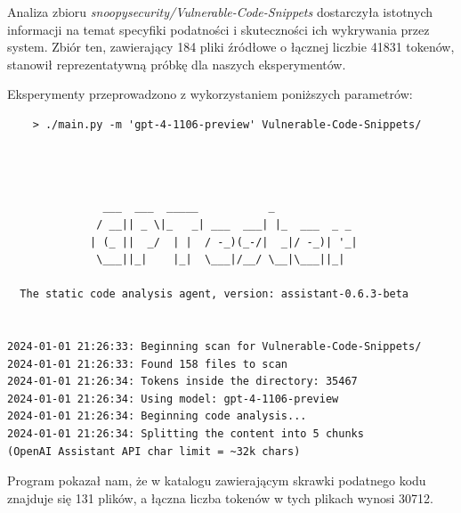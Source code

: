 Analiza zbioru \textit{snoopysecurity/Vulnerable-Code-Snippets} dostarczyła istotnych informacji na temat specyfiki podatności i skuteczności ich wykrywania przez system. Zbiór ten, zawierający 184 pliki źródłowe o łącznej liczbie 41831 tokenów, stanowił reprezentatywną próbkę dla naszych eksperymentów.

Eksperymenty przeprowadzono z wykorzystaniem poniższych parametrów:
\begin{framed}
\begin{verbatim}
    > ./main.py -m 'gpt-4-1106-preview' Vulnerable-Code-Snippets/
\end{verbatim}

\hline
\begin{verbatim}



               ___  ___  _____           _             
              / __|| _ \|_   _| ___  ___| |_  ___  _ _ 
             | (_ ||  _/  | |  / -_)(_-/|  _|/ -_)| '_|
              \___||_|    |_|  \___|/__/ \__|\___||_|  

  The static code analysis agent, version: assistant-0.6.3-beta


2024-01-01 21:26:33: Beginning scan for Vulnerable-Code-Snippets/
2024-01-01 21:26:33: Found 158 files to scan
2024-01-01 21:26:34: Tokens inside the directory: 35467
2024-01-01 21:26:34: Using model: gpt-4-1106-preview
2024-01-01 21:26:34: Beginning code analysis...
2024-01-01 21:26:34: Splitting the content into 5 chunks 
(OpenAI Assistant API char limit = ~32k chars)
\end{verbatim}
\end{framed}

Program pokazał nam, że w katalogu zawierającym skrawki podatnego kodu znajduje się 131 plików, a łączna liczba tokenów w tych plikach wynosi 30712.

